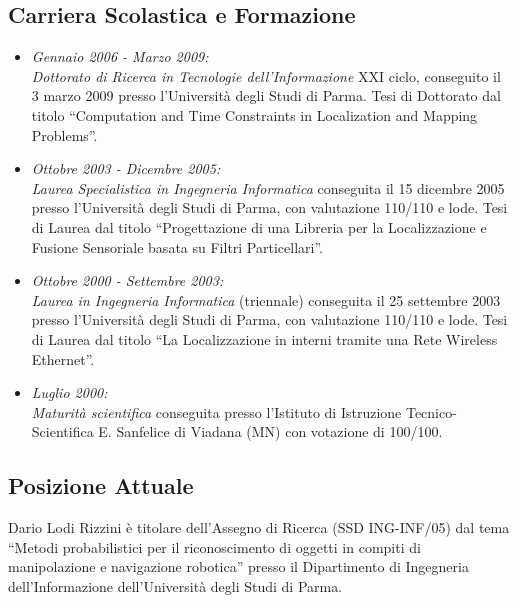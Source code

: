\documentclass[11pt]{article}
\newcommand{\ITEMDATE}[1]{\item \textit{#1:}\\}
\begin{document}

\subsection*{Carriera Scolastica e Formazione}

\begin{itemize}

\ITEMDATE{Gennaio 2006 - Marzo 2009}
  \emph{Dottorato di Ricerca in Tecnologie dell'Informazione} 
  XXI ciclo, conseguito il 3 marzo 2009 presso l'Universit\`a degli Studi di Parma.
  Tesi di Dottorato dal titolo ``Computation and Time Constraints in Localization and Mapping Problems''.

\ITEMDATE{Ottobre 2003 - Dicembre 2005}
\emph{Laurea Specialistica in Ingegneria Informatica}
conseguita il 15 dicembre 2005 presso l'Universit\`a degli Studi di Parma, 
con valutazione 110/110 e lode.
Tesi di Laurea dal titolo ``Progettazione di una Libreria per la Localizzazione 
e Fusione Sensoriale basata su Filtri Particellari''.

\ITEMDATE{Ottobre 2000 - Settembre 2003}
\emph{Laurea in Ingegneria Informatica} (triennale) 
conseguita il 25 settembre 2003 presso l'Universit\`a degli Studi di Parma, 
con valutazione 110/110 e lode.
Tesi di Laurea dal titolo ``La Localizzazione in interni tramite una Rete Wireless 
Ethernet''.

\ITEMDATE{Luglio 2000}
\emph{Maturit\`a scientifica} conseguita
presso l'Istituto di Istruzione Tecnico-Scientifica E. Sanfelice di Viadana (MN) con votazione di 100/100.

\end{itemize}


\subsection*{Posizione Attuale}

Dario Lodi Rizzini \`e titolare dell'Assegno di Ricerca (SSD ING-INF/05) dal tema ``Metodi probabilistici per il riconoscimento
di oggetti in compiti di manipolazione e navigazione robotica''
presso il Dipartimento di Ingegneria dell'Informazione dell'Universit\`a degli Studi di Parma.
\end{document}
